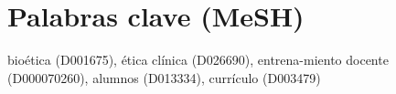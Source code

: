 \documentclass[
]{book}
\begin{document}
\hypertarget{palabras-clave-mesh}{%
\section{Palabras clave (MeSH)}\label{palabras-clave-mesh}}

bioética (D001675), ética clínica (D026690), entrena-miento docente (D000070260), alumnos (D013334), currículo (D003479)

  
\end{document}
